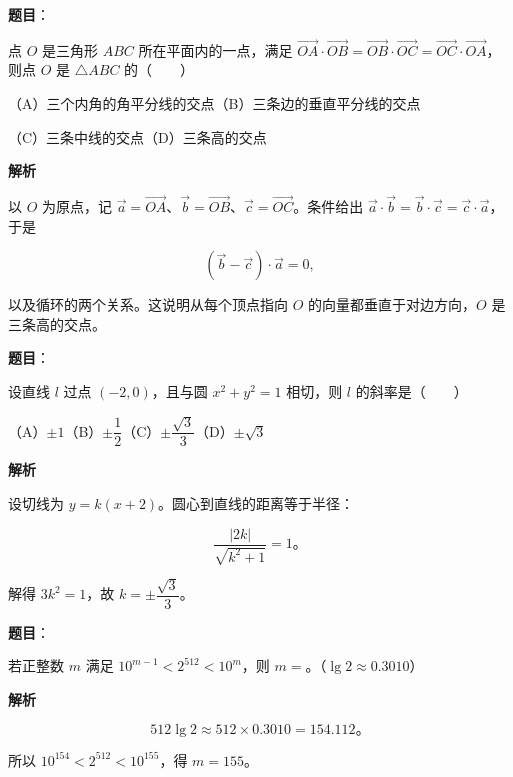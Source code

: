 \begin{answer}

\textbf{题目}：

点 $O$ 是三角形 $ABC$ 所在平面内的一点，满足 $\overrightarrow{OA}\cdot\overrightarrow{OB}=\overrightarrow{OB}\cdot\overrightarrow{OC}=\overrightarrow{OC}\cdot\overrightarrow{OA}$，则点 $O$ 是 $\triangle ABC$ 的\mbox{（　　）}

（A）三个内角的角平分线的交点\quad（B）三条边的垂直平分线的交点

（C）三条中线的交点\quad（D）三条高的交点

\textbf{解析}

以 $O$ 为原点，记 $\vec a=\overrightarrow{OA}$、$\vec b=\overrightarrow{OB}$、$\vec c=\overrightarrow{OC}$。条件给出 $\vec a\cdot\vec b=\vec b\cdot\vec c=\vec c\cdot\vec a$，于是

\nopagebreak[4]
\[
(\vec b-\vec c)\cdot\vec a=0,
\]

以及循环的两个关系。这说明从每个顶点指向 $O$ 的向量都垂直于对边方向，$O$ 是三条高的交点。


\end{answer}
\begin{answer}

\textbf{题目}：

设直线 $l$ 过点 $(-2,0)$，且与圆 $x^2+y^2=1$ 相切，则 $l$ 的斜率是\mbox{（　　）}

（A）$\pm1$\quad（B）$\pm\dfrac12$\quad（C）$\pm\dfrac{\sqrt3}{3}$\quad（D）$\pm\sqrt3$

\textbf{解析}

设切线为 $y=k(x+2)$。圆心到直线的距离等于半径：

\nopagebreak[4]
\[
\frac{|2k|}{\sqrt{k^2+1}}=1\text{。}
\]

解得 $3k^2=1$，故 $k=\pm\dfrac{\sqrt3}{3}$。


\end{answer}
\begin{answer}

\textbf{题目}：

若正整数 $m$ 满足 $10^{m-1}<2^{512}<10^m$，则 $m=$\gkblank{}。（$\lg2\approx0.3010$）

\textbf{解析}

\nopagebreak[4]
\[
512\lg2\approx512\times0.3010=154.112\text{。}
\]

所以 $10^{154}<2^{512}<10^{155}$，得 $m=155$。


\end{answer}
